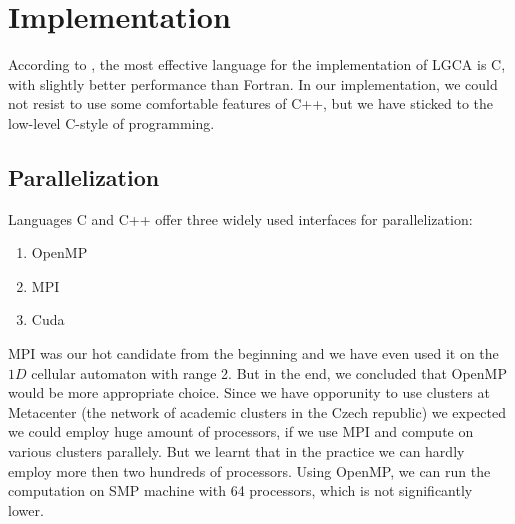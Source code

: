 \chapter{Implementation}

According to \cite{wolf}, the most effective language for the implementation of LGCA is C, with slightly better performance than Fortran.
In our implementation, we could not resist to use some comfortable features of C++, but we have sticked to the low-level C-style of programming.
\bigskip

%



\section{Parallelization}
Languages C and C++ offer three widely used interfaces for parallelization:
\begin{enumerate}
\item OpenMP
\item MPI
\item Cuda
\end{enumerate}
%

\bigskip

MPI was our hot candidate from the beginning and we have even used it on the $1D$ cellular automaton with range 2. 
But in the end, we concluded that OpenMP would be more appropriate choice.
Since we have opporunity to use clusters at Metacenter (the network of academic clusters in the Czech republic) we expected we could employ huge amount of processors, if we use MPI and compute on various clusters parallely. But we learnt that in the practice we can hardly employ more then two hundreds of processors.
Using OpenMP, we can run the computation on SMP machine with 64 processors, which is not significantly lower.

